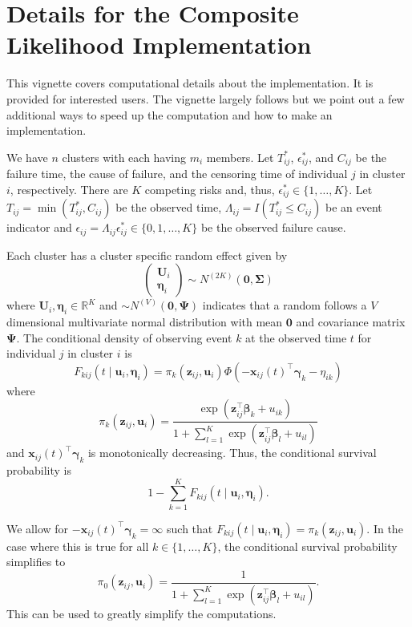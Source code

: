 \documentclass{article}
\newcommand\mat[1]{\mathbf{#1}}
\renewcommand\vec{\bm}
\begin{document}
\section{Details for the Composite Likelihood Implementation}

This vignette covers computational details about the implementation. 
It is provided for interested users. The vignette largely follows 
\cite{Cederkvist18} but we point out a few additional ways to speed up 
the computation and how to make an implementation.

We have $n$ clusters with each having $m_i$ members. Let 
$T_{ij}^*$, $\epsilon_{ij}^*$, and $C_{ij}$ be the 
failure time, the cause of failure, and the censoring time 
of individual $j$ in cluster $i$, respectively. 
There are $K$ competing risks and, thus, 
$\epsilon_{ij}^*\in \{1,\dots,K\}$. Let $T_{ij} = \min(T_{ij}^*, C_{ij})$ 
be the observed time, 
$\Lambda_{ij} = I(T_{ij}^*\leq C_{ij})$ be an 
event indicator and $\epsilon_{ij} = \Lambda_{ij}\epsilon_{ij}^*\in \{0,1,\dots,K\}$ be the
observed failure cause. 

Each cluster has a cluster specific random effect given by %
%
$$
\begin{pmatrix}\vec U_i \\ \vec\eta_i\end{pmatrix}
  \sim N^{(2K)}(\vec 0, \mat\Sigma)
$$%
%
where $\vec U_i,\vec\eta_i\in\mathbb R^K$ and $\sim N^{(V)}(\vec 0, \mat\Psi)$ 
indicates that a random follows a $V$ dimensional multivariate normal
distribution with mean $\vec 0$ and covariance matrix $\mat\Psi$. 
The conditional density of 
observing event $k$ at the observed time $t$ for individual $j$ in cluster 
$i$ is %
%
$$
F_{kij}(t\mid \vec u_i, \vec\eta_i) = 
  \pi_k(\vec z_{ij},\vec u_i)\Phi(-\vec x_{ij}(t)^\top\vec\gamma_k - \eta_{ik})
$$%
%
where %
%
$$
\pi_k(\vec z_{ij},\vec u_i) = 
  \frac{\exp(\vec z_{ij}^\top\vec\beta_k + u_{ik})}
       {1 + \sum_{l = 1}^K \exp(\vec z_{ij}^\top\vec\beta_l + u_{il})}
$$%
%
and $\vec x_{ij}(t)^\top\vec\gamma_k$ is monotonically decreasing. 
Thus, the conditional 
survival probability is%
%
$$
1 - \sum_{k = 1}^K F_{kij}(t\mid \vec u_i, \vec\eta_i).
$$

We allow for $-\vec x_{ij}(t)^\top\vec\gamma_k = \infty$ such that 
$F_{kij}(t\mid \vec u_i, \vec\eta_i) = \pi_k(\vec z_{ij},\vec u_i)$. 
In the case where this is true for all $k\in\{1,\dots,K\}$, 
the conditional survival probability simplifies to %
%
$$
\pi_0(\vec z_{ij},\vec u_i) = 
  \frac
    1{1 + \sum_{l = 1}^K \exp(\vec z_{ij}^\top\vec\beta_l + u_{il})}.
$$%
% 
This can be used to greatly simplify the computations.
\end{document}
